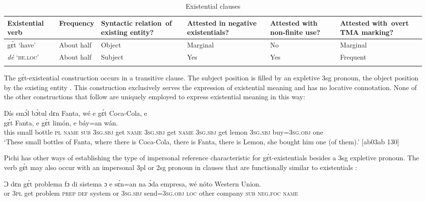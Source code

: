 \begin{table}
\caption{Existential clauses}
\label{tab:key:7.9}

\begin{tabularx}{\textwidth}{p{18mm}lQp{18mm}QQ}
\lsptoprule

Existential verb & Frequency & Syntactic \mbox{relation of} existing entity? & Attested in negative \mbox{existentials?} & Attested with non-finite use? & Attested \mbox{with overt} TMA marking?\\
\midrule
gɛ́t ‘have’ & About half & Object & Marginal & No & Marginal\\
\textit{dé} {\textsc{‘be.loc’}} & About half & Subject & Yes & Yes & Frequent\\
\lspbottomrule
\end{tabularx}
\end{table}
The gɛ́t-existential construction occurs in a transitive clause. The subject position is filled by an expletive 3sg pronoun, the object position by the existing entity . This construction exclusively serves the expression of existential meaning and has no locative connotation. None of the other constructions that follow are uniquely employed to express existential meaning in this way:


\ea%
    \label{ex:key:804}
    \gll Dís  smɔ́l  bɔ́tul  dɛn  Fanta,  wé  e    gɛ́t  Coca-Cola,  e\\
gɛ́t  Fanta,  e    gɛ́t  limón,  e    báy=an    wán.\\
this  small  bottle  \textsc{pl}  \textsc{name}  \textsc{sub}  \textsc{3sg.sbj}  get  \textsc{name}    \textsc{3sg.sbj}
get  \textsc{name}  \textsc{3sg.sbj}  get  lemon  \textsc{3sg.sbj}  buy=\textsc{3sg.obj}  one\\

\glt ‘These small bottles of Fanta, where there is Coca-Cola, there is Fanta, there is 
Lemon, she bought him one (of them).’ [ab03ab 130]
\z

Pichi has other ways of establishing the type of impersonal reference characteristic for gɛ́t-existentials besides a 3sg expletive pronoun{\fff}. The verb gɛ́t may also occur with an impersonal 3pl  or 2sg  pronoun in clauses that are functionally similar to existentials :{\fff}


\ea%
    \label{ex:key:805}
    \gll Ɔ  dɛn  gɛ́t  problema  fɔ  di  sistema  ɔ  e    sɛ́n=an
na  ɔ́da    empresa,    wé  nóto  Western  Union.\\
or  \textsc{3pl}  get  problem    \textsc{prep}  \textsc{def}  system  or  \textsc{3sg.sbj}  send=\textsc{3sg.obj}
\textsc{loc}  other  company    \textsc{sub}  \textsc{neg}.\textsc{foc}  \textsc{name}\\

